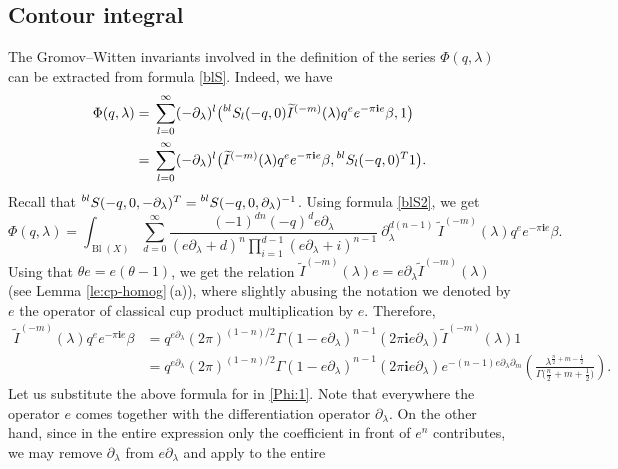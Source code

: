 \documentclass[10pt,a4paper]{article}
\numberwithin{equation}{section}
\newcommand{\leftexp}[2]{{\vphantom{#2}}^{#1}{#2}}
\newcommand{\ii}{\mathbf{i}}
\begin{document}
\subsection{Contour integral}\label{sec:ci}
The Gromov--Witten invariants involved in the definition of the series $\Phi(q,\lambda)$ can be extracted from formula \eqref{blS}. Indeed, we have
\begin{align*}
\Phi(q,\lambda)={}&
\sum_{l=0}^\infty
(-\partial_\lambda)^l
\big(\leftexp{bl}{S}_l(-q,0) \widetilde{I}^{(-m)}(\lambda) q^{e} e^{-\pi\ii e}\beta,1\big)\\
 ={}&
\sum_{l=0}^\infty
(-\partial_\lambda)^l
\big( \widetilde{I}^{(-m)}(\lambda) q^{e} e^{-\pi\ii e}\beta, \leftexp{bl}{S}_l(-q,0)^T 1\big).
\end{align*}
Recall that $
\leftexp{bl}{S}(-q,0,-\partial_\lambda)^T=
\leftexp{bl}{S}(-q,0,\partial_\lambda)^{-1}$. Using formula \eqref{blS2}, we get
\begin{equation}\label{Phi:1}
\Phi(q,\lambda)=\int_{\operatorname{Bl}(X)}
\sum_{d=0}^\infty
\frac{(-1)^{dn} (-q)^d e \partial_\lambda }{
(e\partial_\lambda+d)^n
\prod_{i=1}^{d-1}(e\partial_\lambda +i)^{n-1} } \
\partial_\lambda^{d(n-1)} \
\widetilde{I}^{(-m)}(\lambda) q^{e} e^{-\pi\ii e}\beta.
\end{equation}
Using that $\theta e= e (\theta-1)$, we get the relation
$\widetilde{I}^{(-m)}(\lambda) e = e\partial_\lambda
\widetilde{I}^{(-m)}(\lambda) $ (see Lemma \ref{le:cp-homog}\,(a)),
where slightly abusing the notation we denoted by $e$ the operator of
classical cup product multiplication by $e$. Therefore,
\begin{align*}
\widetilde{I}^{(-m)}(\lambda) q^{e} e^{-\pi\ii e}\beta & =
q^{e\partial_\lambda}
(2\pi)^{(1-n)/2}
\Gamma(1-e\partial_\lambda )^{n-1}
(2\pi\ii e\partial_\lambda )
\widetilde{I}^{(-m)}(\lambda) 1\\
& =
q^{e\partial_\lambda}
(2\pi)^{(1-n)/2}
\Gamma(1-e\partial_\lambda )^{n-1}
(2\pi\ii e\partial_\lambda )
e^{-(n-1) e \partial_\lambda \partial_m}\!
\left(
\frac{\lambda^{\frac{n}{2}+m-\frac{1}{2} } }{
\Gamma\big( \frac{n}{2}+m+\frac{1}{2} \big) }
\right).
\end{align*}
Let us substitute the above formula for \smash{$\widetilde{I}^{(-m)}(\lambda)
q^{e} e^{-\pi\ii e}\beta$} in \eqref{Phi:1}. Note that everywhere the
operator $e$ comes together with the differentiation operator
$\partial_\lambda$. On the other hand, since in the entire expression only
the coefficient in front of $e^n$ contributes, we may remove
$\partial_\lambda$ from $e\partial_\lambda$ and apply to the entire
\end{document}
